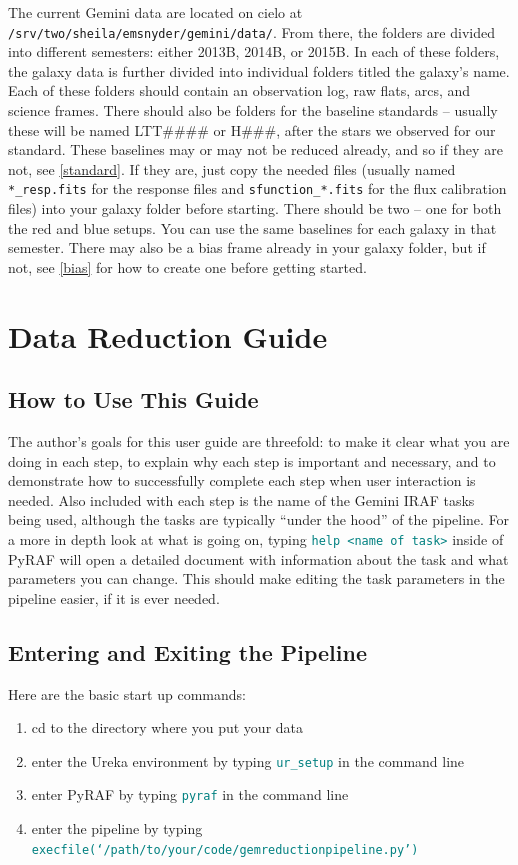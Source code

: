 \documentclass[12pt]{report}
\newcommand{\ty}[1]{\textcolor{teal}{\texttt{#1}}}
\begin{document}
The current Gemini data are located on cielo at \texttt{/srv/two/sheila/emsnyder/gemini/data/}. From there, the folders are divided into different semesters: either 2013B, 2014B, or 2015B. In each of these folders, the galaxy data is further divided into individual folders titled the galaxy's name. Each of these folders should contain an observation log, raw flats, arcs, and science frames. There should also be folders for the baseline standards -- usually these will be named LTT\#\#\#\# or H\#\#\#, after the stars we observed for our standard. These baselines may or may not be reduced already, and so if they are not, see \autoref{standard}. If they are, just copy the needed files (usually named \texttt{*\_resp.fits} for the response files and \texttt{sfunction\_*.fits} for the flux calibration files) into your galaxy folder before starting. There should be two -- one for both the red and blue setups. You can use the same baselines for each galaxy in that semester. There may also be a bias frame already in your galaxy folder, but if not, see \autoref{bias} for how to create one before getting started.


\chapter{Data Reduction Guide}

\section{How to Use This Guide}
The author's goals for this user guide are threefold: to make it clear what you are doing in each step, to explain why each step is important and necessary, and to demonstrate how to successfully complete each step when user interaction is needed. Also included with each step is the name of the Gemini IRAF tasks being used, although the tasks are typically ``under the hood'' of the pipeline. For a more in depth look at what is going on, typing \ty{help <name of task>} inside of PyRAF will open a detailed document with information about the task and what parameters you can change. This should make editing the task parameters in the pipeline easier, if it is ever needed.

\bigskip
\section{Entering and Exiting the Pipeline}
Here are the basic start up commands: 
\begin{enumerate}
\item cd to the directory where you put your data
\item enter the Ureka environment by typing \ty{ur\_setup} in the command line 
\item enter PyRAF by typing \ty{pyraf} in the command line
\item enter the pipeline by typing \ty{execfile(`/path/to/your/code/gemreductionpipeline.py')}
\end{enumerate}
\end{document}
